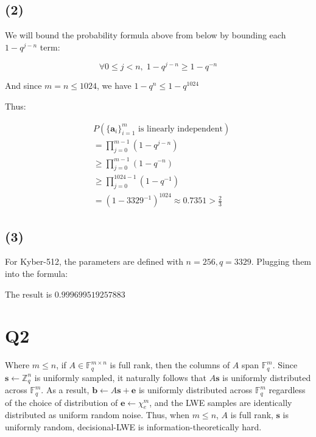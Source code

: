 \documentclass{article}
\begin{document}
\subsection*{(2)}
We will bound the probability formula above from below by bounding each $1 - q^{j-n}$ term:

$$
\forall 0 \leq j < n, \; 1 - q^{j-n} \geq 1 - q^{-n}
$$

And since $m = n \leq 1024$, we have $1 - q^n \leq 1 - q^{1024}$

Thus:

$$
\begin{aligned}
&P(\{\mathbf{a}_i\}_{i=1}^m \text{ is linearly independent}) \\
&= \prod_{j=0}^{m-1}(1 - q^{j - n}) \\
&\geq \prod_{j=0}^{m-1}(1 - q^{-n}) \\
&\geq \prod_{j=0}^{1024 - 1}(1 - q^{-1}) \\
&= (1 - 3329^{-1})^{1024} \approx 0.7351 > \frac{2}{3}
\end{aligned}
$$

\subsection*{(3)}
For Kyber-512, the parameters are defined with $n=256, q=3329$. Plugging them into the formula:



The result is $0.999699519257883$

\newpage

\section*{Q2}
Where $m \leq n$, if $A \in \mathbb{F}_q^{m \times n}$ is full rank, then the columns of $A$ span $\mathbb{F}_q^m$. Since $\mathbf{s} \leftarrow \mathbb{Z}_q^n$ is uniformly sampled, it naturally follows that $A\mathbf{s}$ is uniformly distributed across $\mathbb{F}_q^m$. As a result, $\mathbf{b} \leftarrow A\mathbf{s} + \mathbf{e}$ is uniformly distributed across $\mathbb{F}_q^m$ regardless of the choice of distribution of $\mathbf{e} \leftarrow \chi_e^m$, and the LWE samples are identically distributed as uniform random noise. Thus, when $m \leq n$, $A$ is full rank, $\mathbf{s}$ is uniformly random, decisional-LWE is information-theoretically hard.

\newpage
\end{document}
